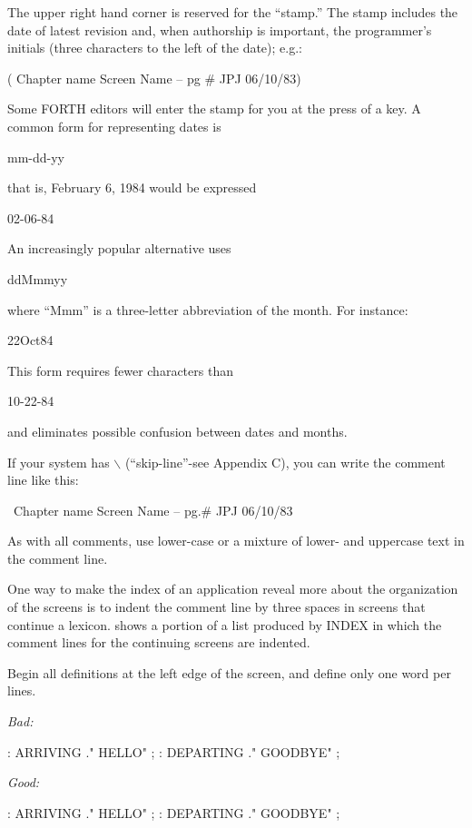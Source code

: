 The upper right hand corner is reserved for the ``stamp.'' The stamp
includes the date of latest revision and, when authorship is important,
the programmer's initials (three characters to the left of the date); e.g.:
\begin{Code}
( Chapter name          Screen Name -- pg #       JPJ 06/10/83)
\end{Code}
Some FORTH editors will enter the stamp for you at the press of a key.
A common form for representing dates is
\begin{Code}
mm-dd-yy
\end{Code}
that is, February 6, 1984 would be expressed
\begin{Code}
02-06-84
\end{Code}
An increasingly popular alternative uses
\begin{Code}
ddMmmyy
\end{Code}
where ``Mmm'' is a three-letter abbreviation of the month.  For instance:
\begin{Code}
22Oct84
\end{Code}

This form requires fewer characters than
\begin{Code}
10-22-84
\end{Code}
and eliminates possible confusion between dates and months.

If your system has $\backslash${} (``skip-line''-see Appendix C), you can write
the comment line like this:
\begin{Code}
\ Chapter name          Screen Name -- pg.#         JPJ 06/10/83
\end{Code}
As with all comments, use lower-case or a mixture of lower- and uppercase
text in the comment line.

One way to make the index of an application reveal more about the
organization of the screens is to indent the comment line by three spaces
in screens that continue a lexicon.   shows a portion of a list produced
by INDEX in which the comment lines for the continuing screens
are indented.

\begin{tip}
Begin all definitions at the left edge of the screen, and define only one word
per lines.
\end{tip}
\emph{Bad:}
\begin{Code}
: ARRIVING ." HELLO" ;  : DEPARTING ." GOODBYE" ;
\end{Code}
\emph{Good:}
\begin{Code}
: ARRIVING  ." HELLO" ;
: DEPARTING ." GOODBYE" ;
\end{Code}

